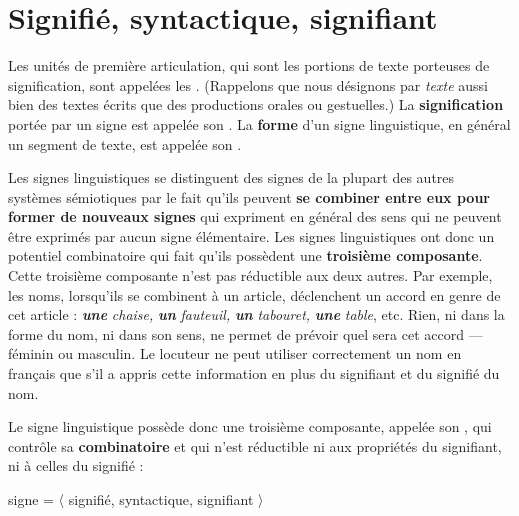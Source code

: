 \section{Signifié, syntactique, signifiant}\label{sec:2.1.3}

{Les unités de première articulation, qui sont les portions de texte porteuses de signification, sont appelées les . (Rappelons que nous désignons par \textit{texte} aussi bien des textes écrits que des productions orales ou gestuelles.) La \textbf{signification} portée par un signe est appelée son . La \textbf{forme} d’un signe linguistique, en général un segment de texte, est appelée son .}

Les signes linguistiques se distinguent des signes de la plupart des autres systèmes sémiotiques par le fait qu’ils peuvent \textbf{se combiner entre eux pour former de nouveaux signes} qui expriment en général des sens qui ne peuvent être exprimés par aucun signe élémentaire. Les signes linguistiques ont donc un potentiel combinatoire qui fait qu’ils possèdent une \textbf{troisième composante}. Cette troisième composante n’est pas réductible aux deux autres. Par exemple, les noms, lorsqu’ils se combinent à un article, déclenchent un accord en genre de cet article : \textbf{\textit{une}} \textit{chaise,} \textbf{\textit{un}} \textit{fauteuil,} \textbf{\textit{un}} \textit{tabouret,} \textbf{\textit{une}} \textit{table}, etc. Rien, ni dans la forme du nom, ni dans son sens, ne permet de prévoir quel sera cet accord — féminin ou masculin. Le locuteur ne peut utiliser correctement un nom en français que s’il a appris cette information en plus du signifiant et du signifié du nom.

{Le signe linguistique possède donc une troisième composante, appelée son , qui contrôle sa \textbf{combinatoire} et qui n’est réductible ni aux propriétés du signifiant, ni à celles du signifié :

\begin{center} signe = 〈 signifié, syntactique, signifiant 〉\end{center}}

